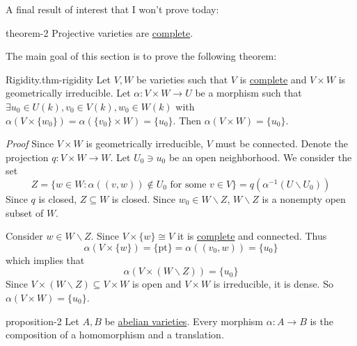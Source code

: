 \documentclass[10pt,]{book}
\makeatletter
\renewcommand*{\proofname}{Proof}
\renewenvironment{proof}[1][\proofname]{\par
  \pushQED{\qed}%
  \normalfont \topsep6\p@\@plus6\p@\relax
  \trivlist
  \item\relax
    {\itshape
    #1\@addpunct{.}}\hspace\labelsep\ignorespaces
}{%
  \popQED\endtrivlist\@endpefalse
}
\numberwithin{equation}{section}
\makeatother
\begin{document}
\hypertarget{p-27}{}%
A final result of interest that I won't prove today:%
\begin{theorem}{}{}{theorem-2}%
\hypertarget{p-28}{}%
Projective varieties are \hyperref[def-abelian-complete-var]{complete}.%
\end{theorem}
\hypertarget{p-29}{}%
The main goal of this section is to prove the following theorem:%
\begin{theorem}{Rigidity.}{}{thm-rigidity}%
\hypertarget{p-30}{}%
Let \(V,W\) be varieties such that \(V\) is \hyperref[def-abelian-complete-var]{complete} and  \(V\times W\) is geometrically irreducible. Let \(\alpha\colon V\times W \to U\) be a morphism such that \(\exists u_0\in U(k), v_0\in V(k), w_0\in W(k)\) with \(\alpha(V\times\{w_0\}) = \alpha (\{v_0\}\times W ) = \{u_0\}\). Then \(\alpha (V\times W) = \{u_0\}\).%
\end{theorem}
\begin{proof}\hypertarget{proof-5}{}
\hypertarget{p-31}{}%
Since \(V\times W\) is geometrically irreducible, \(V\) must be connected. Denote the projection \(q\colon V\times W \to W\). Let \(U_0 \ni u_0\) be an open neighborhood. We consider the set%
\begin{equation*}
Z = \{w\in W : \alpha((v,w)) \not\in U_0 \text{ for some } v\in V\} = q(\alpha^{-1}(U\smallsetminus U_0))
\end{equation*}
Since \(q\) is closed, \(Z\subseteq W\) is closed. Since \(w_0\in W\smallsetminus Z\), \(W\smallsetminus Z\) is a nonempty open subset of \(W\).%
\par
\hypertarget{p-32}{}%
Consider \(w \in W\smallsetminus Z\). Since \(V\times\{w\} \cong V\) it is \hyperref[def-abelian-complete-var]{complete} and connected. Thus%
\begin{equation*}
\alpha(V\times \{w\}) = \{\text{pt}\} = \alpha((v_0,w)) = \{u_0\}
\end{equation*}
which implies that%
\begin{equation*}
\alpha(V\times (W\smallsetminus Z)) = \{u_0\}
\end{equation*}
Since \(V\times (W\smallsetminus Z) \subseteq V\times W\) is open and \(V\times W\) is irreducible, it is dense. So \(\alpha(V\times W) = \{u_0\}\).%
\end{proof}
\begin{proposition}{}{}{proposition-2}%
\hypertarget{p-33}{}%
Let \(A,B\) be \hyperref[def-buntes-abvar]{abelian varieties}. Every morphism \(\alpha \colon A \to B \) is the composition of a homomorphism and a translation.%
\end{proposition}
\end{document}
